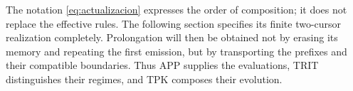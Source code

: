 The notation \eqref{eq:actualizacion} expresses the order of composition; it does not replace the effective rules. The following section specifies its finite two-cursor realization completely. Prolongation will then be obtained not by erasing its memory and repeating the first emission, but by transporting the prefixes and their compatible boundaries. Thus APP supplies the evaluations, TRIT distinguishes their regimes, and TPK composes their evolution.




